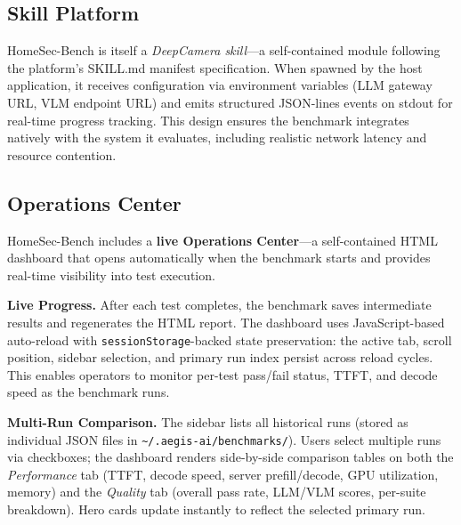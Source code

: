 \documentclass[conference]{IEEEtran}
\begin{document}
\subsection{Skill Platform}
HomeSec-Bench is itself a \emph{DeepCamera skill}---a self-contained
module following the platform's SKILL.md manifest specification. When
spawned by the host application, it receives configuration via
environment variables (LLM gateway URL, VLM endpoint URL) and emits
structured JSON-lines events on stdout for real-time progress tracking.
This design ensures the benchmark integrates natively with the system
it evaluates, including realistic network latency and resource
contention.

\subsection{Operations Center}
\label{sec:operations}

HomeSec-Bench includes a \textbf{live Operations Center}---a self-contained
HTML dashboard that opens automatically when the benchmark starts and
provides real-time visibility into test execution.

\textbf{Live Progress.} After each test completes, the benchmark saves
intermediate results and regenerates the HTML report. The dashboard uses
JavaScript-based auto-reload with \texttt{sessionStorage}-backed state
preservation: the active tab, scroll position, sidebar selection, and
primary run index persist across reload cycles. This enables operators
to monitor per-test pass/fail status, TTFT, and decode speed as the
benchmark runs.

\textbf{Multi-Run Comparison.} The sidebar lists all historical runs
(stored as individual JSON files in \texttt{\~{}/.aegis-ai/benchmarks/}).
Users select multiple runs via checkboxes; the dashboard renders
side-by-side comparison tables on both the \emph{Performance} tab
(TTFT, decode speed, server prefill/decode, GPU utilization, memory)
and the \emph{Quality} tab (overall pass rate, LLM/VLM scores,
per-suite breakdown). Hero cards update instantly to reflect the
selected primary run.
\end{document}
